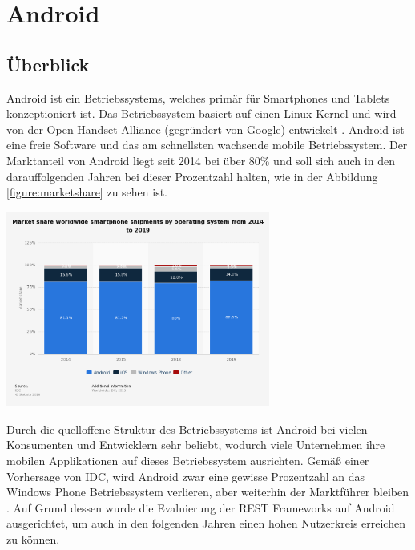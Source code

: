 \chapter{Android}
\label{sec:android}

\section{Überblick}
Android ist ein Betriebssystems, welches primär für Smartphones und Tablets konzeptioniert ist. Das Betriebssystem basiert auf einen Linux Kernel und wird von der Open Handset Alliance (gegründert von Google) entwickelt \cite{overviewAndroid:singh}. Android ist eine freie Software und das am schnellsten wachsende mobile Betriebssystem. Der Marktanteil von Android liegt seit 2014 bei über 80\% und soll sich auch in den darauffolgenden Jahren bei dieser Prozentzahl halten, wie in der Abbildung \ref{figure:marketshare} zu sehen ist. \\
 
\begin{minipage}{\textwidth} 
	\centering	
	\includegraphics[width=0.65\textwidth]{figures/smartphone-os-market-share.png}
	\label{figure:marketshare}
	\vspace{2ex}
\end{minipage}

Durch die quelloffene Struktur des Betriebssystems ist Android bei vielen Konsumenten und Entwicklern sehr beliebt, wodurch viele Unternehmen ihre mobilen Applikationen auf dieses Betriebssystem ausrichten. Gemäß einer Vorhersage von IDC, wird Android zwar eine gewisse Prozentzahl an das Windows Phone Betriebssystem verlieren, aber weiterhin der Marktführer bleiben \cite{statsticMobileOS}. Auf Grund dessen wurde die Evaluierung der REST Frameworks auf Android ausgerichtet, um auch in den folgenden Jahren einen hohen Nutzerkreis erreichen zu können.

